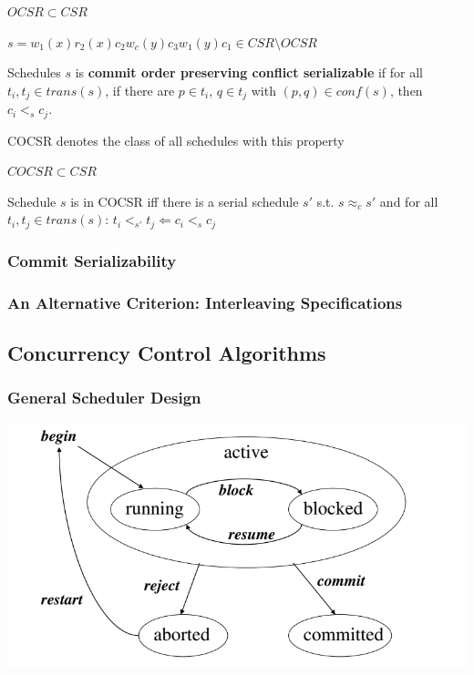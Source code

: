 \documentclass[11pt]{article}
\begin{document}
\begin{theorem}[]
\(OCSR\subset CSR\)
\end{theorem}

\(s=w_1(x)r_2(x)c_2w_c(y)c_3w_1(y)c_1\in CSR\setminus OCSR\)


\begin{definition}[]
Schedules \(s\) is \textbf{commit order preserving conflict serializable} if for
all \(t_i,t_j\in trans(s)\), if there are \(p\in t_i\), \(q\in t_j\) with \((p,q)\in conf(s)\),
then \(c_i<_sc_j\).

COCSR denotes the class of all schedules with this property
\end{definition}

\begin{theorem}[]
\(COCSR\subset CSR\)
\end{theorem}

\begin{theorem}[]
Schedule \(s\) is in COCSR iff there is a serial schedule \(s'\) s.t. \(s\approx_cs'\) and for
all \(t_i,t_j\in trans(s)\): \(t_i<_{s'}t_j\Leftarrow c_i<_{s}c_j\)
\end{theorem}
\subsubsection{Commit Serializability}
\label{sec:org1a41ba5}
\subsubsection{An Alternative Criterion: Interleaving Specifications}
\label{sec:orgf854784}
\subsection{Concurrency Control Algorithms}
\label{sec:orgc065bfb}
\subsubsection{General Scheduler Design}
\label{sec:orgc1efb6e}
\begin{center}
\includegraphics[width=.8\textwidth]{../images/bigdatabase/8.png}
\label{}
\end{center}
\end{document}
